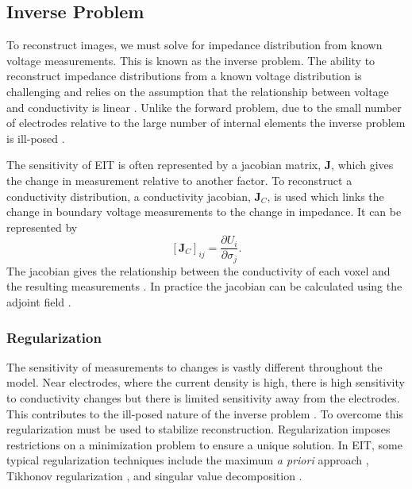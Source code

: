 \subsection{Inverse Problem} \label{sec:inv_prob}
To reconstruct images, we must solve for impedance distribution from known voltage measurements. 
This is known as the inverse problem. 
The ability to reconstruct impedance distributions from a known voltage distribution is challenging 
and relies on the assumption that the relationship between voltage and conductivity is 
linear \parencite{barber_applied_1984}.
Unlike the forward problem, due to the small number of electrodes 
relative to the large number of internal elements the inverse problem is
ill-posed \parencite{holder_electrical_2004}.

The sensitivity of EIT is often represented by a jacobian matrix, $\mathbf{J}$,
which gives the change in measurement relative to another factor. To reconstruct 
a conductivity distribution, a conductivity jacobian, $\mathbf{J}_C$, is used
which links the change 
in boundary voltage measurements to the change in impedance. It can be represented by 
\begin{equation} \label{eq:jacobian_c}
	[\mathbf{J}_C]_{ij} = \frac{\partial U_i}{\partial \sigma_j}. 
\end{equation}
The jacobian gives the relationship between the conductivity of each voxel and the resulting
measurements \parencite{holder_electrical_2004}.
In practice the jacobian can be calculated using the adjoint 
field \parencite{vauhkonen_three-dimensional_1999}. 

\subsubsection{Regularization}
The sensitivity of measurements to changes is vastly different throughout the model. 
Near electrodes, where the current density is high, there is high sensitivity to conductivity 
changes but there is limited sensitivity away from the electrodes. This contributes 
to the ill-posed nature of the inverse problem \parencite{holder_electrical_2004}.
To overcome this regularization must be used to stabilize reconstruction. 
Regularization imposes restrictions on a minimization problem to ensure a unique solution.
In EIT, some typical regularization techniques include the maximum \emph{a priori} approach
\parencite{adler_electrical_1996}, Tikhonov regularization \parencite{vauhkonen_tikhonov_1998},
and singular value decomposition \parencite{ostebee_rank-deficient_1998}.

